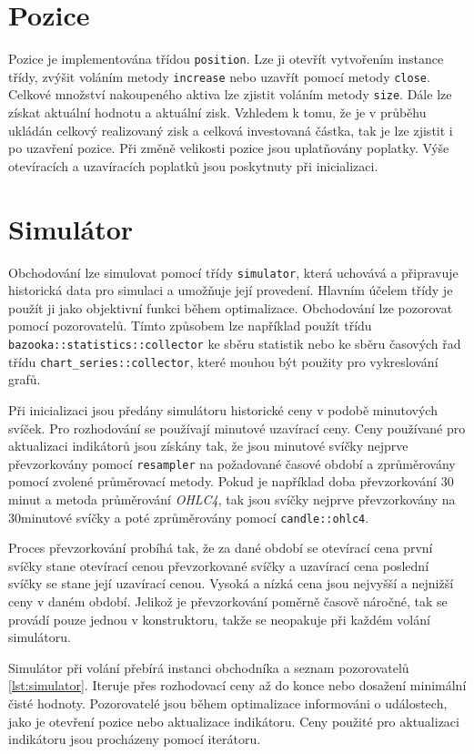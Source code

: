\section{Pozice}
Pozice je implementována třídou \texttt{position}.
Lze ji otevřít vytvořením instance třídy, zvýšit voláním metody \texttt{increase} nebo uzavřít pomocí metody \texttt{close}.
Celkové množství nakoupeného aktiva lze zjistit voláním metody \texttt{size}.
Dále lze získat aktuální hodnotu a aktuální zisk.
Vzhledem k tomu, že je v průběhu ukládán celkový realizovaný zisk a celková investovaná částka, tak je lze zjistit i po uzavření pozice.
Při změně velikosti pozice jsou uplatňovány poplatky.
Výše otevíracích a uzavíracích poplatků jsou poskytnuty při inicializaci.

\section{Simulátor}
Obchodování lze simulovat pomocí třídy \texttt{simulator}, která uchovává a připravuje historická data pro simulaci a umožňuje její provedení.
Hlavním účelem třídy je použít ji jako objektivní funkci během optimalizace.
Obchodování lze pozorovat pomocí pozorovatelů.
Tímto způsobem lze například použít třídu \texttt{bazooka::statistics::collector} ke sběru statistik nebo ke sběru časových řad třídu \texttt{chart\_series::collector}, které mouhou být použity pro vykreslování grafů.

Při inicializaci jsou předány simulátoru historické ceny v podobě minutových svíček.
Pro rozhodování se používají minutové uzavírací ceny.
Ceny používané pro aktualizaci indikátorů jsou získány tak, že jsou minutové svíčky nejprve převzorkovány pomocí \texttt{resampler} na požadované časové období a zprůměrovány pomocí zvolené průměrovací metody.
Pokud je například doba převzorkování 30 minut a metoda průměrování \textit{OHLC4}, tak jsou svíčky nejprve převzorkovány na 30minutové svíčky a poté zprůměrovány pomocí \texttt{candle::ohlc4}.

Proces převzorkování probíhá tak, že za dané období se otevírací cena první svíčky stane otevírací cenou převzorkované svíčky a uzavírací cena poslední svíčky se stane její uzavírací cenou.
Vysoká a nízká cena jsou nejvyšší a nejnižší ceny v daném období.
Jelikož je převzorkování poměrně časově náročné, tak se provádí pouze jednou v konstruktoru, takže se neopakuje při každém volání simulátoru.

Simulátor při volání přebírá instanci obchodníka a seznam pozorovatelů \ref{lst:simulator}.
Iteruje přes rozhodovací ceny až do konce nebo dosažení minimální čisté hodnoty.
Pozorovatelé jsou během optimalizace informováni o událostech, jako je otevření pozice nebo aktualizace indikátoru.
Ceny použité pro aktualizaci indikátoru jsou procházeny pomocí iterátoru.

